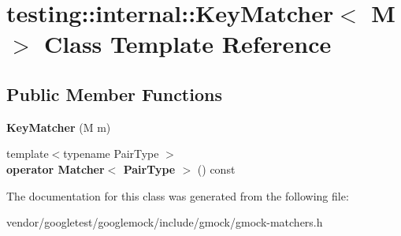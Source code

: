 \hypertarget{classtesting_1_1internal_1_1KeyMatcher}{}\section{testing\+:\+:internal\+:\+:Key\+Matcher$<$ M $>$ Class Template Reference}
\label{classtesting_1_1internal_1_1KeyMatcher}
\subsection*{Public Member Functions}
\begin{DoxyCompactItemize}
\item 
{\bfseries Key\+Matcher} (M m)\hypertarget{classtesting_1_1internal_1_1KeyMatcher_a08429692150bf9304b493192abcf16d4}{}\label{classtesting_1_1internal_1_1KeyMatcher_a08429692150bf9304b493192abcf16d4}

\item 
{\footnotesize template$<$typename Pair\+Type $>$ }\\{\bfseries operator Matcher$<$ Pair\+Type $>$} () const \hypertarget{classtesting_1_1internal_1_1KeyMatcher_ae8380c09682da0b2d50f167b298246d0}{}\label{classtesting_1_1internal_1_1KeyMatcher_ae8380c09682da0b2d50f167b298246d0}

\end{DoxyCompactItemize}


The documentation for this class was generated from the following file\+:\begin{DoxyCompactItemize}
\item 
vendor/googletest/googlemock/include/gmock/gmock-\/matchers.\+h\end{DoxyCompactItemize}

